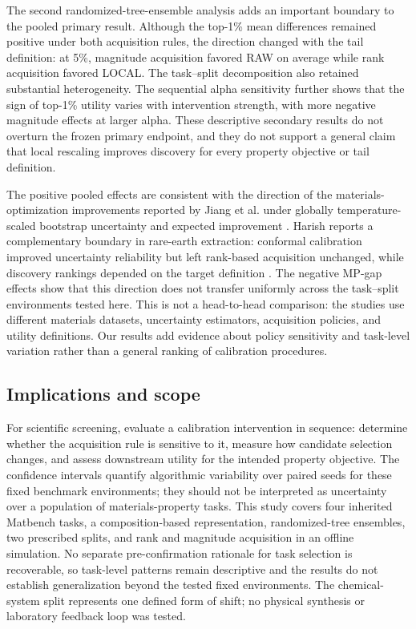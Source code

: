 \documentclass[11pt]{article}
\begin{document}
The second randomized-tree-ensemble analysis adds an important boundary to the pooled primary result. Although the top-1\% mean differences remained positive under both acquisition rules, the direction changed with the tail definition: at 5\%, magnitude acquisition favored RAW on average while rank acquisition favored LOCAL. The task--split decomposition also retained substantial heterogeneity. The sequential alpha sensitivity further shows that the sign of top-1\% utility varies with intervention strength, with more negative magnitude effects at larger alpha. These descriptive secondary results do not overturn the frozen primary endpoint, and they do not support a general claim that local rescaling improves discovery for every property objective or tail definition.

The positive pooled effects are consistent with the direction of the materials-optimization improvements reported by Jiang et al. under globally temperature-scaled bootstrap uncertainty and expected improvement \citep{jiang2026calibration_optimization}. Harish reports a complementary boundary in rare-earth extraction: conformal calibration improved uncertainty reliability but left rank-based acquisition unchanged, while discovery rankings depended on the target definition \citep{harish2026objective}. The negative MP-gap effects show that this direction does not transfer uniformly across the task--split environments tested here. This is not a head-to-head comparison: the studies use different materials datasets, uncertainty estimators, acquisition policies, and utility definitions. Our results add evidence about policy sensitivity and task-level variation rather than a general ranking of calibration procedures.

\subsection{Implications and scope}
For scientific screening, evaluate a calibration intervention in sequence: determine whether the acquisition rule is sensitive to it, measure how candidate selection changes, and assess downstream utility for the intended property objective. The confidence intervals quantify algorithmic variability over paired seeds for these fixed benchmark environments; they should not be interpreted as uncertainty over a population of materials-property tasks. This study covers four inherited Matbench tasks, a composition-based representation, randomized-tree ensembles, two prescribed splits, and rank and magnitude acquisition in an offline simulation. No separate pre-confirmation rationale for task selection is recoverable, so task-level patterns remain descriptive and the results do not establish generalization beyond the tested fixed environments. The chemical-system split represents one defined form of shift; no physical synthesis or laboratory feedback loop was tested.
\end{document}
